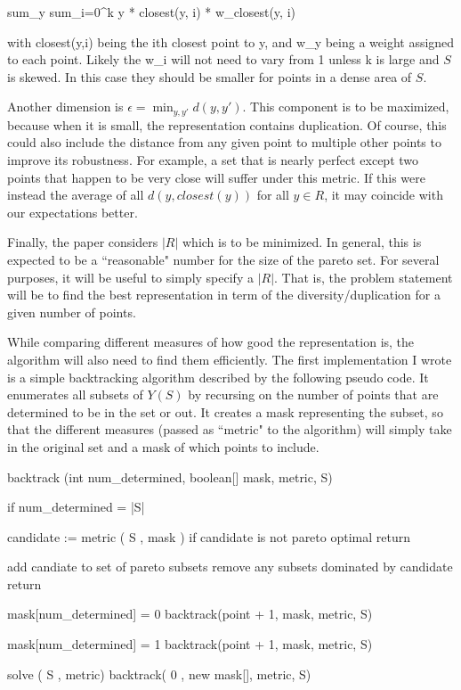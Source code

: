{{sum_y sum_i=0^k y * closest(y, i) * w_{closest(y, i)}

with closest(y,i) being the ith closest point to y, and w_y being a weight assigned to each point.
Likely the w_i will not need to vary from 1 unless k is large and $S$ is skewed.
In this case they should be smaller for points in a dense area of $S$.


Another dimension is $\epsilon = \min_{y,y'} d(y,y')$.
This component is to be maximized, because when it is small, the representation contains duplication.
Of course, this could also include the distance from any given point to multiple other points to improve its robustness.
For example, a set that is nearly perfect except two points that happen to be very close will suffer under this metric.
If this were instead the average of all $d(y, closest(y))$ for all $y \in R$, it may coincide with our expectations better.

Finally, the paper considers $|R|$ which is to be minimized.
In general, this is expected to be a ``reasonable" number for the size of the pareto set.
For several purposes, it will be useful to simply specify a $|R|$.
That is, the problem statement will be to find the best representation in term of the diversity/duplication for a given number of points.


While comparing different measures of how good the representation is, the algorithm will also need to find them efficiently.
The first implementation I wrote is a simple backtracking algorithm described by the following pseudo code.
It enumerates all subsets of $Y(S)$ by recursing on the number of points that are determined to be in the set or out.
It creates a mask representing the subset, so that the different measures (passed as ``metric" to the algorithm) will simply take in the original set and a mask of which points to include.



backtrack (int num_determined, boolean[] mask, metric, S)
{
	if num_determined = |S|
	{
		candidate := metric ( S , mask )
		if candidate is not pareto optimal
		{
		  return
		}
		
		add candiate to set of pareto subsets
		remove any subsets dominated by candidate
		return
	}
	
	mask[num_determined] = 0
	backtrack(point + 1, mask, metric, S)
	
	mask[num_determined] = 1
	backtrack(point + 1, mask, metric, S)
}

solve ( S , metric)
{
      backtrack( 0 , new mask[], metric, S)
}


}}
